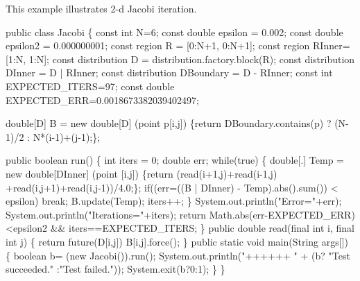 
This example illustrates 2-d Jacobi iteration.

\begin{x10}
 public class Jacobi  \{
   const int N=6;
   const double epsilon = 0.002;
   const double epsilon2 = 0.000000001;
   const region R = [0:N+1, 0:N+1];
   const region RInner= [1:N, 1:N];
   const distribution D = distribution.factory.block(R);
   const distribution DInner = D | RInner;
   const distribution DBoundary = D - RInner;
   const int EXPECTED\_ITERS=97;
   const double EXPECTED\_ERR=0.0018673382039402497;
     
   double[D] B = new double[D] (point p[i,j])
       \{return DBoundary.contains(p) 
                ? (N-1)/2 : N*(i-1)+(j-1);\};
    
   public boolean run() \{
      int iters = 0;
      double err;
      while(true) \{
        double[.] Temp = 
           new double[DInner] (point [i,j]) 
             \{return (read(i+1,j)+read(i-1,j)
                      +read(i,j+1)+read(i,j-1))/4.0;\};       
        if((err=((B | DInner) - Temp).abs().sum()) 
            < epsilon)
           break; 
        B.update(Temp);
        iters++; 
      \}
      System.out.println("Error="+err);
      System.out.println("Iterations="+iters);
      return Math.abs(err-EXPECTED\_ERR)<epsilon2 
          \&\& iters==EXPECTED\_ITERS;
   \}
   public double read(final int i, final int j) \{
      return future(D[i,j]) {B[i,j]}.force();
   \}
   public static void main(String args[]) \{
      boolean b= (new Jacobi()).run();
      System.out.println("++++++ "
                         + (b? "Test succeeded."
                             :"Test failed."));
      System.exit(b?0:1);
   \}
\}
\end{x10}
